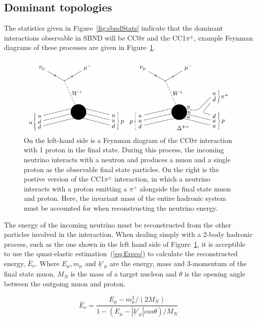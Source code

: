 \subsection{Dominant topologies}

The statistics given in Figure~\ref{fig:sbndStats} indicate that the dominant interactions observable in SBND will be CC0$\pi$ and the CC1$\pi ^{\pm}$, example Feynman diagrams of these processes are given in Figure~\ref{fig:feyn}. 

    \begin{figure}[h!]
        \includegraphics[width=\textwidth]{images/feynmans.pdf}
        \caption{On the left-hand side is a Feynman diagram of the CC0$\pi$ interaction with 1 proton in the final state. During this process, the incoming neutrino interacts with a neutron and produces a muon and a single proton as the observable final state particles. On the right is the postive version of the CC1$\pi ^{\pm}$ interaction, in which a neutrino interacts with a proton emitting a $\pi ^{+}$ alongside the final state muon and proton. Here, the invariant mass of the entire hadronic system must be accounted for when reconstructing the neutrino energy.}
        \label{fig:feyn}
    \end{figure}
    
    The energy of the incoming neutrino must be reconstructed from the other particles involved in the interaction. When dealing simply with a 2-body hadronic process, such as the one shown in the left hand side of Figure~\ref{fig:feyn}, it is acceptible to use the quasi-elastic estimation~(\ref{eq:Ereco}) \cite{teppei} to calculate the reconstructed energy, $\bar{E}_{\nu}$. Where $E_{\mu}, m_{\mu}$ and $\underline{k}'_{\mu}$ are the energy, mass and 3-momentum of the final state muon, $M_{N}$ is the mass of a target nucleon and $\theta$ is the opening angle between the outgoing muon and proton.  


    \begin{equation}\label{eq:Ereco}
        \bar{E}_{\nu} = \frac{ E_{\mu} - m^{2}_{\mu} / (2M_{N}) }{ 1 - ( E_{\mu} - |\underline{k}'_{\mu}| cos \theta ) / M_{N} }
    \end{equation}

